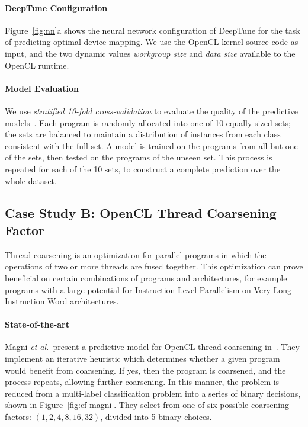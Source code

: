 \paragraph{DeepTune Configuration} Figure~\ref{fig:nn}a shows the neural network
configuration of DeepTune for the task of predicting optimal device mapping. We
use the OpenCL kernel source code as input, and the two dynamic values
\emph{workgroup size} and \emph{data size} available to the OpenCL runtime.

\paragraph{Model Evaluation} We use \emph{stratified 10-fold cross-validation}
to evaluate the quality of the predictive models~\cite{Han2011}. Each program is
randomly allocated into one of 10 equally-sized sets; the sets are balanced to
maintain a distribution of instances from each class consistent with the full
set. A model is trained on the programs from all but one of the sets, then
tested on the programs of the unseen set. This process is repeated for each of
the 10 sets, to construct a complete prediction over the whole dataset.






\subsection{Case Study B: OpenCL Thread Coarsening Factor} \label{subsec:case-study-b}



Thread coarsening is an optimization for parallel programs in which the
operations of two or more threads are fused together. This optimization can
prove beneficial on certain combinations of programs and architectures, for
example programs with a large potential for Instruction Level Parallelism on
Very Long Instruction Word architectures.

\paragraph{State-of-the-art} Magni \emph{et al.\ }present a predictive model for
OpenCL thread coarsening in~\cite{Magni2014}. They implement an iterative
heuristic which determines whether a given program would benefit from
coarsening. If yes, then the program is coarsened, and the process repeats,
allowing further coarsening. In this manner, the problem is reduced from a
multi-label classification problem into a series of binary decisions, shown in
Figure~\ref{fig:cf-magni}. They select from one of six possible coarsening
factors: $(1, 2, 4, 8, 16, 32)$, divided into 5 binary choices.

